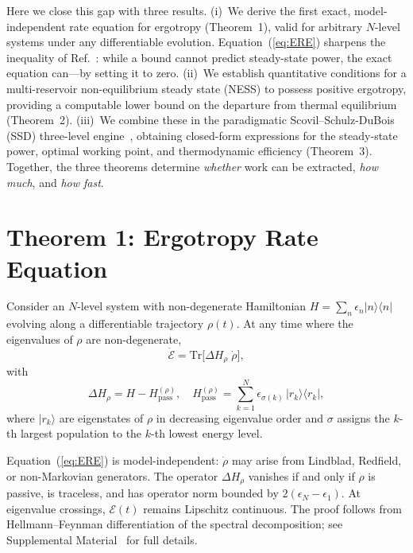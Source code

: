 \documentclass[prl,twocolumn,superscriptaddress,amsmath,amssymb]{revtex4-2}
\begin{document}
Here we close this gap with three results. (i)~We derive the first exact, model-independent rate equation for ergotropy (Theorem~1), valid for arbitrary $N$-level systems under any differentiable evolution. Equation~(\ref{eq:ERE}) sharpens the inequality of Ref.~\cite{Francica2020}: while a bound cannot predict steady-state power, the exact equation can---by setting it to zero. (ii)~We establish quantitative conditions for a multi-reservoir non-equilibrium steady state (NESS) to possess positive ergotropy, providing a computable lower bound on the departure from thermal equilibrium (Theorem~2). (iii)~We combine these in the paradigmatic Scovil--Schulz-DuBois (SSD) three-level engine~\cite{SSD1959}, obtaining closed-form expressions for the steady-state power, optimal working point, and thermodynamic efficiency (Theorem~3). Together, the three theorems determine \emph{whether} work can be extracted, \emph{how much}, and \emph{how fast}.

\section{Theorem 1: Ergotropy Rate Equation}

Consider an $N$-level system with non-degenerate Hamiltonian $H = \sum_n \epsilon_n |n\rangle\langle n|$ evolving along a differentiable trajectory $\rho(t)$. At any time where the eigenvalues of $\rho$ are non-degenerate,
\begin{equation}\label{eq:ERE}
\dot{\mathcal{E}} = \mathrm{Tr}\bigl[\Delta H_\rho \;\dot\rho\bigr],
\end{equation}
with
\begin{equation}\label{eq:DeltaH}
\Delta H_\rho = H - H_{\mathrm{pass}}^{(\rho)}, \quad H_{\mathrm{pass}}^{(\rho)} = \sum_{k=1}^N \epsilon_{\sigma(k)}\,|r_k\rangle\langle r_k|,
\end{equation}
where $|r_k\rangle$ are eigenstates of $\rho$ in decreasing eigenvalue order and $\sigma$ assigns the $k$-th largest population to the $k$-th lowest energy level.

Equation~(\ref{eq:ERE}) is model-independent: $\dot\rho$ may arise from Lindblad, Redfield, or non-Markovian generators. The operator $\Delta H_\rho$ vanishes if and only if $\rho$ is passive, is traceless, and has operator norm bounded by $2(\epsilon_N - \epsilon_1)$. At eigenvalue crossings, $\mathcal{E}(t)$ remains Lipschitz continuous. The proof follows from Hellmann--Feynman differentiation of the spectral decomposition; see Supplemental Material~\cite{SM} for full details.
\end{document}
